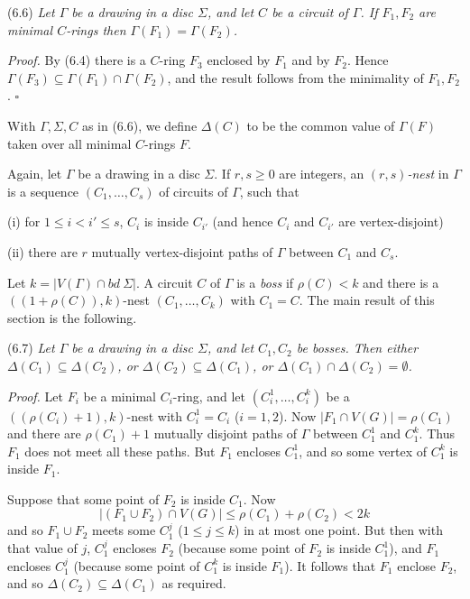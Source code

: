 \stmt
(6.6) \textit{Let $\Gamma$ be a drawing in a disc $\Sigma$, and let $C$ be a circuit of $\Gamma$. If $F_1, F_2$ are minimal $C$-rings then $\Gamma(F_1) = \Gamma(F_2)$.}

\textit{Proof.} By (6.4) there is a $C$-ring $F_3$ enclosed by $F_1$ and by $F_2$. Hence $\Gamma(F_3) \subseteq \Gamma(F_1) \cap \Gamma(F_2)$, and the result follows from the minimality of $F_1, F_2$. $\square$

With $\Gamma, \Sigma, C$ as in (6.6), we define $\Delta(C)$ to be the common value of $\Gamma(F)$ taken over all minimal $C$-rings $F$.

Again, let $\Gamma$ be a drawing in a disc $\Sigma$. If $r, s \ge 0$ are integers, an \textit{$(r, s)$-nest} in $\Gamma$ is a sequence $(C_1, \dots, C_s)$ of circuits of $\Gamma$, such that

\hspace*{12pt}(i) for $1 \le i < i' \le s$, $C_i$ is inside $C_{i'}$ (and hence $C_i$ and $C_{i'}$ are vertex-disjoint)

\hspace*{12pt}(ii) there are $r$ mutually vertex-disjoint paths of $\Gamma$ between $C_1$ and $C_s$.

Let $k = |V(\Gamma) \cap bd\ \Sigma|$. A circuit $C$ of $\Gamma$ is a \textit{boss} if $\rho(C) < k$ and there is a $((1 + \rho(C)), k)$-nest $(C_1, \dots, C_k)$ with $C_1 = C$. The main result of this section is the following.

\stmt
(6.7) \textit{Let $\Gamma$ be a drawing in a disc $\Sigma$, and let $C_1, C_2$ be bosses. Then either $\Delta(C_1) \subseteq \Delta(C_2)$, or $\Delta(C_2) \subseteq \Delta(C_1)$, or $\Delta(C_1) \cap \Delta(C_2) = \emptyset$.}

\textit{Proof.} Let $F_i$ be a minimal $C_i$-ring, and let $(C_i^1, \dots, C_i^k)$ be a $((\rho(C_i) + 1), k)$-nest with $C_i^1 = C_i$ ($i = 1, 2$). Now $|F_1 \cap V(G)| = \rho(C_1)$ and there are $\rho(C_1) + 1$ mutually disjoint paths of $\Gamma$ between $C_1^1$ and $C_1^k$. Thus $F_1$ does not meet all these paths. But $F_1$ encloses $C_1^1$, and so some vertex of $C_1^k$ is inside $F_1$.

Suppose that some point of $F_2$ is inside $C_1$. Now
\begin{equation*}
|(F_1 \cup F_2) \cap V(G)| \le \rho(C_1) + \rho(C_2) < 2k
\end{equation*}
and so $F_1 \cup F_2$ meets some $C_1^j$ ($1 \le j \le k$) in at most one point. But then with that value of $j$, $C_1^j$ encloses $F_2$ (because some point of $F_2$ is inside $C_1^1$), and $F_1$ encloses $C_1^j$ (because some point of $C_1^k$ is inside $F_1$). It follows that $F_1$ enclose $F_2$, and so $\Delta(C_2) \subseteq \Delta(C_1)$ as required.

